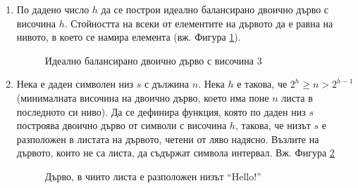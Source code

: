 \begin{enumerate}[resume]

  \item По дадено число $h$ да се построи идеално балансирано двоично дърво с височина $h$. Стойността на всеки от елементите на дървото да е равна на нивото, в което се намира елемента (вж. Фигура \ref{fig:balanced}).

  \begin{figure}
  \centering
  \caption{Идеално балансирано двоично дърво с височина 3}
  \label{fig:balanced}
  \end{figure}

  \item {Нека е даден символен низ $s$ с дължина $n$. Нека $h$ е такова, че $2^h \geq n > 2^{h-1}$ } (минималната височина на двоично дърво, което има поне $n$ листа в последното си ниво). Да се дефинира функция, която по даден низ $s$ построява двоично дърво от символи с височина $h$, такова, че низът $s$ е разположен в листата на дървото, четени от ляво надясно. Възлите на дървото, които не са листа, да съдържат символа интервал. Вж. Фигура \ref{fig:stringleaves}

  \begin{figure}
  \centering
  \caption{Дърво, в чиито листа е разположен низът ``Hello!''}
  \label{fig:stringleaves}
  \end{figure}



\end{enumerate}
